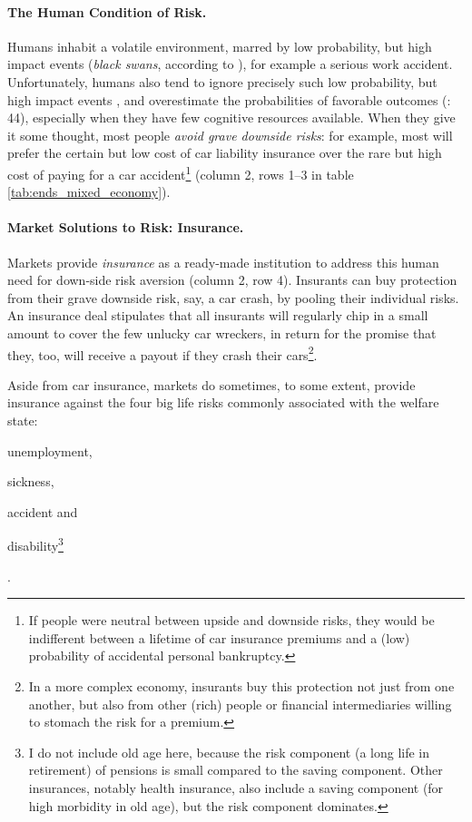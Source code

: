 
\paragraph{The Human Condition of Risk.}  \label{sec:human_condition_of_risk} Humans inhabit a volatile environment, marred by low probability, but high impact events (\emph{black swans}, according to \citealt{Taleb2007}), for example a serious work accident. Unfortunately, humans also tend to ignore precisely such low probability, but high impact events \citep{Taleb2007}, and overestimate the probabilities of favorable outcomes (\citealt{Baron2000}: 44), especially when they have few cognitive resources available. 
When they give it some thought, most people \emph{avoid grave downside risks}: for example, most will prefer the certain but low cost of car liability insurance over the rare but high cost of paying for a car accident\footnote{
	If people were neutral between upside and downside risks, they would be indifferent between a lifetime of car insurance premiums and a (low) probability of accidental personal bankruptcy.} %
(column 2, rows 1--3 in table \ref{tab:ends_mixed_economy}).

\paragraph{Market Solutions to Risk: Insurance.}  \label{sec:insurance} Markets provide \emph{insurance} as a ready-made institution to address this human need for down-side risk aversion (column 2, row 4). Insurants can buy protection from their grave downside risk, say, a car crash, by pooling their individual risks. An insurance deal stipulates that all insurants will regularly chip in a small amount to cover the few unlucky car wreckers, in return for the promise that they, too, will receive a payout if they crash their cars\footnote{
	In a more complex economy, insurants buy this protection not just from one another, but also from other (rich) people or financial intermediaries willing to stomach the risk for a premium.}. 

Aside from car insurance, markets do sometimes, to some extent, provide insurance against the four big life risks commonly associated with the welfare state: \begin{inparaenum}[1)] 
	\item unemployment, 
	\item sickness, 
	\item accident and 
	\item disability\footnote{
	I do not include old age here, because the risk component (a long life in retirement) of pensions is small compared to the saving component. Other insurances, notably health insurance, also include a saving component (for high morbidity in old age), but the risk component dominates.}\end{inparaenum}.
	
